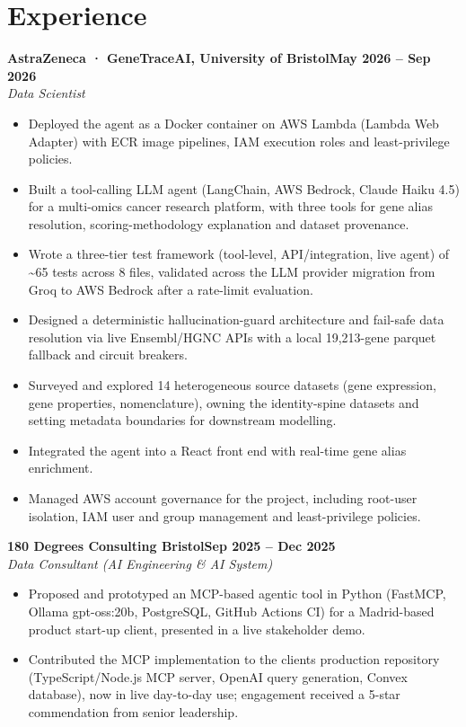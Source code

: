 \documentclass[a4paper,11pt]{article}
\newcommand{\entry}[4]{\needspace{4\baselineskip}\noindent\textbf{#1}\hfill\textbf{#2}\\ \textit{#3}\hfill\textit{#4}\par}
\begin{document}
\section{Experience}
\entry{AstraZeneca · GeneTraceAI, University of Bristol}{May 2026 – Sep 2026}{Data Scientist}{}
\begin{itemize}
  \item Deployed the agent as a Docker container on AWS Lambda (Lambda Web Adapter) with ECR image pipelines, IAM execution roles and least-privilege policies.
  \item Built a tool-calling LLM agent (LangChain, AWS Bedrock, Claude Haiku 4.5) for a multi-omics cancer research platform, with three tools for gene alias resolution, scoring-methodology explanation and dataset provenance.
  \item Wrote a three-tier test framework (tool-level, API/integration, live agent) of \textasciitilde{}65 tests across 8 files, validated across the LLM provider migration from Groq to AWS Bedrock after a rate-limit evaluation.
  \item Designed a deterministic hallucination-guard architecture and fail-safe data resolution via live Ensembl/HGNC APIs with a local 19,213-gene parquet fallback and circuit breakers.
  \item Surveyed and explored 14 heterogeneous source datasets (gene expression, gene properties, nomenclature), owning the identity-spine datasets and setting metadata boundaries for downstream modelling.
  \item Integrated the agent into a React front end with real-time gene alias enrichment.
  \item Managed AWS account governance for the project, including root-user isolation, IAM user and group management and least-privilege policies.
\end{itemize}
\vspace{4pt}
\entry{180 Degrees Consulting Bristol}{Sep 2025 – Dec 2025}{Data Consultant (AI Engineering \& AI System)}{}
\begin{itemize}
  \item Proposed and prototyped an MCP-based agentic tool in Python (FastMCP, Ollama gpt-oss:20b, PostgreSQL, GitHub Actions CI) for a Madrid-based product start-up client, presented in a live stakeholder demo.
  \item Contributed the MCP implementation to the client\textquotesingle{}s production repository (TypeScript/Node.js MCP server, OpenAI query generation, Convex database), now in live day-to-day use; engagement received a 5-star commendation from senior leadership.
\end{itemize}
\end{document}
